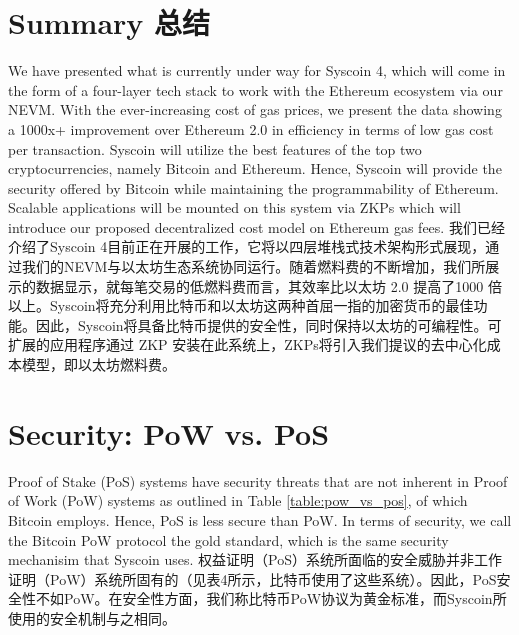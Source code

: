 \documentclass{ctexart}
\begin{document}
\section{Summary 总结}
\label{section:summary}
We have presented what is currently under way for Syscoin 4, which will come in the form of a four-layer tech stack to work with the Ethereum ecosystem via our NEVM. With the ever-increasing cost of gas prices, we present the data showing a 1000x+ improvement over Ethereum 2.0 in efficiency in terms of low gas cost per transaction. Syscoin will utilize the best features of the top two cryptocurrencies, namely Bitcoin and Ethereum. Hence, Syscoin will provide the security offered by Bitcoin while maintaining the programmability of Ethereum. Scalable applications will be mounted on this system via ZKPs which will introduce our proposed decentralized cost model on Ethereum gas fees. 我们已经介绍了Syscoin 4目前正在开展的工作，它将以四层堆栈式技术架构形式展现，通过我们的NEVM与以太坊生态系统协同运行。随着燃料费的不断增加，我们所展示的数据显示，就每笔交易的低燃料费而言，其效率比以太坊 2.0 提高了1000 倍以上。Syscoin将充分利用比特币和以太坊这两种首屈一指的加密货币的最佳功能。因此，Syscoin将具备比特币提供的安全性，同时保持以太坊的可编程性。可扩展的应用程序通过 ZKP 安装在此系统上，ZKPs将引入我们提议的去中心化成本模型，即以太坊燃料费。

\appendices

\section{Security: PoW vs. PoS }

Proof of Stake (PoS) systems have security threats that are not inherent in Proof of Work (PoW) systems as outlined in Table \ref{table:pow_vs_pos}, of which Bitcoin employs. Hence, PoS is less secure than PoW. In terms of security, we call the Bitcoin PoW protocol the gold standard, which is the same security mechanisim that Syscoin uses. 权益证明（PoS）系统所面临的安全威胁并非工作证明（PoW）系统所固有的（见表4所示，比特币使用了这些系统）。因此，PoS安全性不如PoW。在安全性方面，我们称比特币PoW协议为黄金标准，而Syscoin所使用的安全机制与之相同。
\end{document}
